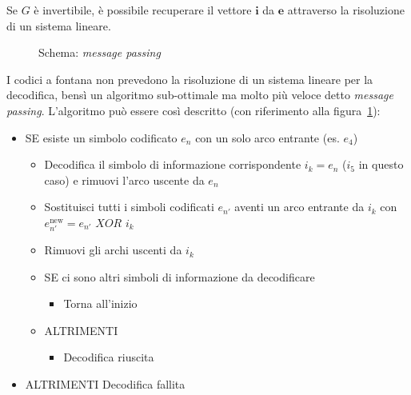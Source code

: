 \documentclass[italian, a4paper, 12pt]{article}
\begin{document}
Se $G$ è invertibile, è possibile recuperare il vettore $\bm{i}$ da $\bm{e}$ attraverso la risoluzione di un sistema lineare.\\
\begin{figure}[htb]
    \centering
    \caption{Schema: \textit{message passing}}
    \label{fig:FC}
\end{figure}
I codici a fontana non prevedono la risoluzione di un sistema lineare per la decodifica, bensì un algoritmo sub-ottimale ma molto più veloce detto \emph{message passing}. L'algoritmo può essere così descritto (con riferimento alla figura~\ref{fig:FC}):
\begin{itemize}
        \item SE esiste un simbolo codificato $e_n$ con un solo arco entrante (es. $e_4$)\begin{itemize}
                \item	Decodifica il simbolo di informazione corrispondente $i_k=e_n$ ($i_5$ in questo caso) e rimuovi l'arco uscente da $e_n$
                \item	Sostituisci tutti i simboli codificati $e_{n'}$ aventi un arco entrante da $i_k$ con $e_{n'}^{\text{new}} = e_{n'} \textit{ XOR } i_k$
                \item   Rimuovi gli archi uscenti da $i_k$
                \item   SE ci sono altri simboli di informazione da decodificare \begin{itemize}
                        \item Torna all'inizio
                \end{itemize}
                \item ALTRIMENTI\begin{itemize}
                        \item Decodifica riuscita
                \end{itemize}
        \end{itemize}

        \item ALTRIMENTI Decodifica fallita
\end{itemize}
\end{document}
